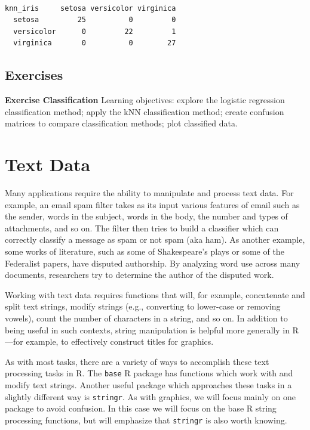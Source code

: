 \documentclass[]{krantz}
\begin{document}
\begin{verbatim}
            
knn_iris     setosa versicolor virginica
  setosa         25          0         0
  versicolor      0         22         1
  virginica       0          0        27
\end{verbatim}

\section{Exercises}\label{exercises-7}

\textbf{Exercise Classification} Learning objectives: explore the
logistic regression classification method; apply the kNN classification
method; create confusion matrices to compare classification methods;
plot classified data.

\chapter{Text Data}\label{xml}

Many applications require the ability to manipulate and process text
data. For example, an email spam filter takes as its input various
features of email such as the sender, words in the subject, words in the
body, the number and types of attachments, and so on. The filter then
tries to build a classifier which can correctly classify a message as
spam or not spam (aka ham). As another example, some works of
literature, such as some of Shakespeare's plays or some of the
Federalist papers, have disputed authorship. By analyzing word use
across many documents, researchers try to determine the author of the
disputed work.

Working with text data requires functions that will, for example,
concatenate and split text strings, modify strings (e.g., converting to
lower-case or removing vowels), count the number of characters in a
string, and so on. In addition to being useful in such contexts, string
manipulation is helpful more generally in R---for example, to
effectively construct titles for graphics.

As with most tasks, there are a variety of ways to accomplish these text
processing tasks in R. The \texttt{base} R package has functions which
work with and modify text strings. Another useful package which
approaches these tasks in a slightly different way is \texttt{stringr}.
As with graphics, we will focus mainly on one package to avoid
confusion. In this case we will focus on the base R string processing
functions, but will emphasize that \texttt{stringr} is also worth
knowing.
\end{document}
